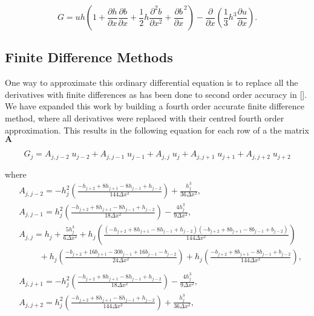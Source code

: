 	\[ G =  uh \left(1 + \frac{\partial h}{\partial x}\frac{\partial b}{\partial x} + \frac{1}{2}h\frac{\partial^2 b}{\partial x^2} + \frac{\partial b}{\partial x}^2 \right) - \frac{\partial}{\partial x}\left(\frac{1}{3}h^3  \frac{\partial {u}}{\partial x}\right).\]
\subsection{Finite Difference Methods}
One way to approximate this ordinary differential equation is to replace all the derivatives with finite differences as has been done to second order accuracy in []. We have expanded this work by  building a fourth order accurate finite difference method, where all derivatives were replaced with their centred fourth order approximation. This results in the following equation for each row of a the matrix $\boldsymbol{A}$

\begin{equation}
G_j = A_{j,j-2} \;u_{j-2} + A_{j,j-1} \; u_{j-1} + A_{j,j} \; u_{j} +  A_{j,j + 1} \;u_{j+1} +  A_{j,j + 2} \;u_{j+2}
\end{equation}

where 
\begin{align*}
&A_{j,j-2} = -h^2_j \left(\frac{-h_{j+2} + 8 h_{j+1} - 8h_{j-1} + h_{j-2}}{144 \Delta x ^2}\right) + \frac{h_{j}^3}{36 \Delta x^2} , \\
&A_{j,j-1} = h^2_j \left(\frac{-h_{j+2} + 8 h_{j+1} - 8h_{j-1} + h_{j-2}}{18 \Delta x ^2}\right) - \frac{4h_{j}^3}{9 \Delta x^2} , \\
&A_{j,j} = h_j + \frac{5h_{j}^3}{6 \Delta x^2}   + h_j \left(\frac{ \left(-h_{j+2} + 8 h_{j+1} - 8h_{j-1} + h_{j-2} \right) \left(-b_{j+2} + 8 b_{j+1} - 8b_{j-1} + b_{j-2} \right) }{144 \Delta x ^2}\right)  \\
& \hspace{1cm}+ h_j \left(\frac{-b_{j+2} + 16 b_{j+1} - 30b_{j-1} + 16b_{j-1} - b_{j-2}}{24 \Delta x ^2}\right)  + h_j \left(\frac{ -b_{j+2} + 8 b_{j+1} - 8b_{j-1} + b_{j-2}  }{144 \Delta x ^2}\right), \\ \\
&A_{j,j+1} = -h^2_j \left(\frac{-h_{j+2} + 8 h_{j+1} - 8h_{j-1} + h_{j-2}}{18 \Delta x ^2}\right) - \frac{4h_{j}^3}{9 \Delta x^2} , \\
&A_{j,j+2} = h^2_j \left(\frac{-h_{j+2} + 8 h_{j+1} - 8h_{j-1} + h_{j-2}}{144 \Delta x ^2}\right) + \frac{h_{j}^3}{36 \Delta x^2} , \\
\end{align*}

